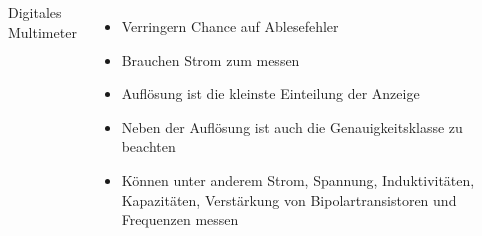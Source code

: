 \begin{frame}
\begin{columns}
\begin{center}
      {\tiny Digitales Multimeter \href{refs}{\cite{wmde}}}
    \end{center}
    \begin{itemize}
      \item Verringern Chance auf Ablesefehler
      \item Brauchen Strom zum messen
      \item Auflösung ist die kleinste Einteilung der Anzeige
      \item Neben der Auflösung ist auch die Genauigkeitsklasse zu beachten
      \item Können unter anderem Strom, Spannung, Induktivitäten, Kapazitäten, Verstärkung von Bipolartransistoren und Frequenzen messen
    \end{itemize}
  \end{columns}
\end{frame}

